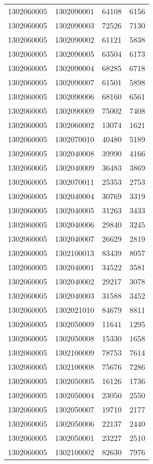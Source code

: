 \begin{longtable}[h]{llcc}
		1302060005 & 1302090001 & 64108 & 6156\\
		1302060005 & 1302090003 & 72526 & 7130\\
		1302060005 & 1302090002 & 61121 & 5838\\
		1302060005 & 1302090005 & 63504 & 6173\\
		1302060005 & 1302090004 & 68285 & 6718\\
		1302060005 & 1302090007 & 61501 & 5898\\
		1302060005 & 1302090006 & 68160 & 6561\\
		1302060005 & 1302090009 & 75002 & 7408\\
		1302060005 & 1302060002 & 13074 & 1621\\
		1302060005 & 1302070010 & 40480 & 5189\\
		1302060005 & 1302040008 & 39990 & 4166\\
		1302060005 & 1302040009 & 36483 & 3869\\
		1302060005 & 1302070011 & 25353 & 2753\\
		1302060005 & 1302040004 & 30769 & 3319\\
		1302060005 & 1302040005 & 31263 & 3433\\
		1302060005 & 1302040006 & 29840 & 3245\\
		1302060005 & 1302040007 & 26629 & 2819\\
		1302060005 & 1302100013 & 83439 & 8057\\
		1302060005 & 1302040001 & 34522 & 3581\\
		1302060005 & 1302040002 & 29217 & 3078\\
		1302060005 & 1302040003 & 31588 & 3452\\
		1302060005 & 1302021010 & 84679 & 8811\\
		1302060005 & 1302050009 & 11641 & 1295\\
		1302060005 & 1302050008 & 15330 & 1658\\
		1302060005 & 1302100009 & 78753 & 7614\\
		1302060005 & 1302100008 & 75676 & 7286\\
		1302060005 & 1302050005 & 16126 & 1736\\
		1302060005 & 1302050004 & 23050 & 2550\\
		1302060005 & 1302050007 & 19710 & 2177\\
		1302060005 & 1302050006 & 22137 & 2440\\
		1302060005 & 1302050001 & 23227 & 2510\\
		1302060005 & 1302100002 & 82630 & 7976\\

\end{longtable}
